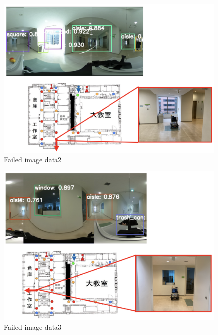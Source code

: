 \documentclass[../main]{subfiles}
\begin{document}
        \begin{figure}[H]
            \centering
            \includegraphics[scale=0.5]{../images/experiment_failed2.png}
            \caption{Failed image data2}
            \label{figure::experiment_failed2}
        \end{figure}  

        \begin{figure} [H]
            \centering
            \includegraphics[scale=0.5]{../images/experiment_failed3.png}
            \caption{Failed image data3}
            \label{figure::experiment_failed3}
        \end{figure}
\end{document}
